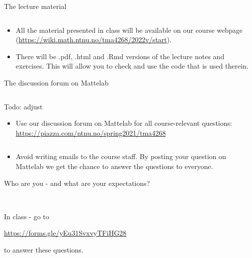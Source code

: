 \documentclass[10pt,ignorenonframetext,]{beamer}
\providecommand{\tightlist}{%
  \setlength{\itemsep}{0pt}\setlength{\parskip}{0pt}}
\begin{document}
\begin{frame}

\begin{block}{The lecture material}

\(~\)

\begin{itemize}
\tightlist
\item
  All the material presented in class will be available on our course
  webpage (\url{https://wiki.math.ntnu.no/tma4268/2022v/start}).
\end{itemize}

\vspace{2mm}

\begin{itemize}
\tightlist
\item
  There will be .pdf, .html and .Rmd versions of the lecture notes and
  exercises. This will allow you to check and use the code that is used
  therein.
\end{itemize}

\end{block}

\end{frame}

\begin{frame}

\begin{block}{The discussion forum on Mattelab}

\(~\)

Todo: adjust

\begin{itemize}
\tightlist
\item
  Use our discussion forum on Mattelab for all course-relevant
  questions: \url{https://piazza.com/ntnu.no/spring2021/tma4268}
\end{itemize}

\(~\)

\begin{itemize}
\tightlist
\item
  Avoid writing emails to the course staff. By posting your question on
  Mattelab we get the chance to answer the questions to everyone.
\end{itemize}

\end{block}

\end{frame}

\begin{frame}{Who are you - and what are your expectations?}
\protect\hypertarget{who-are-you---and-what-are-your-expectations}{}

~

In class - go to

\url{https://forms.gle/yEu31SvxvyTFiHG28}

to answer these questions.

\end{frame}
\end{document}
